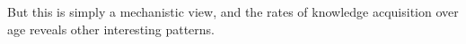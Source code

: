  But this is simply a mechanistic view, and the rates of knowledge acquisition over age reveals other interesting patterns. 











